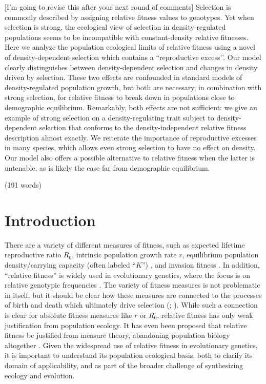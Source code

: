 \documentclass[12pt]{article}
\begin{document}
[I'm going to revise this after your next round of comments]
Selection is commonly described by assigning relative fitness values to genotypes. Yet when selection is strong, the ecological view of selection in density-regulated populations seems to be incompatible with constant-density relative fitnesses. Here we analyze the population ecological limits of relative fitness using a novel of density-dependent selection which contains a ``reproductive excess’’. Our model clearly distinguishes between density-dependent selection and changes in density driven by selection. These two effects are confounded in standard models of density-regulated population growth, but both are necessary, in combination with strong selection, for relative fitness to break down in populations close to demographic equilibrium. Remarkably, both effects are not sufficient: we give an example of strong selection on a density-regulating trait subject to density-dependent selection that conforms to the density-independent relative fitness description almost exactly. We reiterate the importance of reproductive excesses in many species, which allows even strong selection to have no effect on density. Our model also offers a possible alternative to relative fitness when the latter is untenable, as is likely the case far from demographic equilibrium. 

\noindent (191 words)

\newpage{}


\section*{Introduction}

There are a variety of different measures of fitness, such as expected lifetime reproductive ratio $R_0$, intrinsic population growth rate $r$, equilibrium population density/carrying capacity (often labeled ``$K$'') \citep{benton_2000}, and invasion fitness \citep{metz_1992}. In addition, ``relative fitness'' is widely used in evolutionary genetics, where the focus is on relative genotypic frequencies \cite[pp. 468]{barton_2007}. The variety of fitness measures is not problematic in itself, but it should be clear how these measures are connected to the processes of birth and death which ultimately drive selection (\citealt{metcalf_2007,doebeli_2017}; \citealt[pp. 178]{charlesworth_1994}). While such a connection is clear for absolute fitness measures like $r$ or $R_0$, relative fitness has only weak justification from population ecology. It has even been proposed that relative fitness be justified from measure theory, abandoning population biology altogether \citep{wagner_2010}. Given the widespread use of relative fitness in evolutionary genetics, it is important to understand its population ecological basis, both to clarify its domain of applicability, and as part of the broader challenge of synthesizing ecology and evolution.
\end{document}
